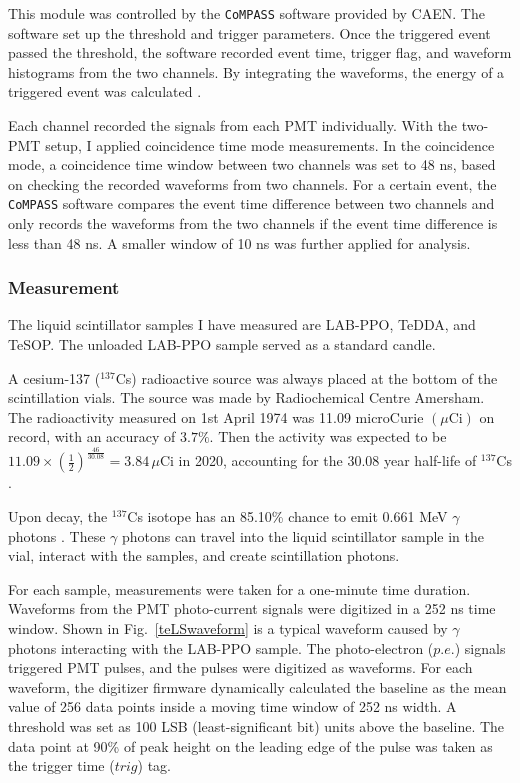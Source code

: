 This module was controlled by the \texttt{CoMPASS} software provided by CAEN. The software set up the threshold and trigger parameters. Once the triggered event passed the threshold, the software recorded event time, trigger flag, and waveform histograms from the two channels. By integrating the waveforms, the energy of a triggered event was calculated \cite{compass}.

Each channel recorded the signals from each PMT individually. With the two-PMT setup, I applied coincidence time mode measurements. In the coincidence mode, a coincidence time window between two channels was set to 48 ns, based on checking the recorded waveforms from two channels. For a certain event, the \texttt{CoMPASS} software compares the event time difference between two channels and only records the waveforms from the two channels if the event time difference is less than 48 ns. A smaller window of 10 ns was further applied for analysis.

\subsubsection{Measurement}

The liquid scintillator samples I have measured are LAB-PPO, TeDDA, and TeSOP. The unloaded LAB-PPO sample served as a standard candle.

A cesium-137 ($^{137}$Cs) radioactive source was always placed at the bottom of the scintillation vials. The source was made by Radiochemical Centre Amersham. The radioactivity measured on 1st April 1974 was 11.09 microCurie $(\mu\mathrm{Ci})$ on record, with an accuracy of $3.7\%$. Then the activity was expected to be 
$11.09\times ({\frac{1}{2}})^{\frac{46}{30.08}}=3.84 \, \mu\mathrm{Ci}$ in 2020, accounting for the 30.08 year half-life of $^{137}$Cs \cite{nndc}.

Upon decay, the $^{137}$Cs isotope has an 85.10\% chance to emit 0.661 MeV $\gamma$ photons \cite{nndc}. These $\gamma$ photons can travel into the liquid scintillator sample in the vial, interact with the samples, and create scintillation photons.

For each sample, measurements were taken for a one-minute time duration. Waveforms from the PMT photo-current signals were digitized in a 252 ns time window. Shown in Fig.~\ref{teLSwaveform} is a typical waveform caused by $\gamma$ photons interacting with the LAB-PPO sample. The photo-electron ($p.e.$) signals triggered PMT pulses, and the pulses were digitized as waveforms. For each waveform, the digitizer firmware dynamically calculated the baseline as the mean value of 256 data points inside a moving time window of 252 ns width. A threshold was set as 100 LSB (least-significant bit) units above the baseline. The data point at 90\% of peak height on the leading edge of the pulse was taken as the trigger time ($trig$) tag.

